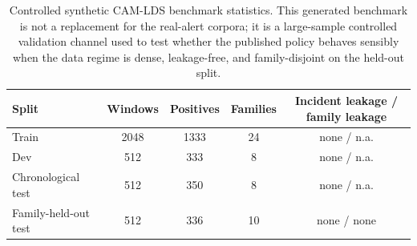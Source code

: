\begin{table}[t]
\centering
\small
\setlength{\tabcolsep}{5pt}
\caption{Controlled synthetic CAM-LDS benchmark statistics. This generated benchmark is not a replacement for the real-alert corpora; it is a large-sample controlled validation channel used to test whether the published policy behaves sensibly when the data regime is dense, leakage-free, and family-disjoint on the held-out split.}
\label{tab:synthetic-cam-lds-stats}
\begin{tabular}{lcccc}
\toprule
Split & Windows & Positives & Families & Incident leakage / family leakage \\
\midrule
Train & 2048 & 1333 & 24 & none / n.a. \\
Dev & 512 & 333 & 8 & none / n.a. \\
Chronological test & 512 & 350 & 8 & none / n.a. \\
Family-held-out test & 512 & 336 & 10 & none / none \\
\bottomrule
\end{tabular}
\end{table}
